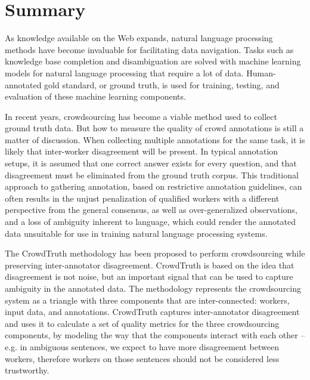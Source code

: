 \manualmark
{}

\chapter*{Summary}

As knowledge available on the Web expands, natural language processing methods have become invaluable for facilitating data navigation. Tasks such as knowledge base completion and disambiguation are solved with machine learning models for natural language processing that require a lot of data. Human-annotated gold standard, or ground truth, is used for training, testing, and evaluation of these machine learning components.

In recent years, crowdsourcing has become a viable method used to collect ground truth data. But how to measure the quality of crowd annotations is still a matter of discussion. When collecting multiple annotations for the same task, it is likely that inter-worker disagreement will be present. In typical annotation setups, it is assumed that one correct answer exists for every question, and that disagreement must be eliminated from the ground truth corpus. This traditional approach to gathering annotation, based on restrictive annotation guidelines, can often results in the unjust penalization of qualified workers with a different perspective from the general consensus, as well as over-generalized observations, and a loss of ambiguity inherent to language, which could render the annotated data unsuitable for use in training natural language processing systems.

The CrowdTruth methodology has been proposed to perform crowdsourcing while preserving inter-annotator disagreement. CrowdTruth is based on the idea that disagreement is not noise, but an important signal that can be used to capture ambiguity in the annotated data. The methodology represents the crowdsourcing system as a triangle with three components that are inter-connected: workers, input data, and annotations. CrowdTruth captures inter-annotator disagreement and uses it to calculate a set of quality metrics for the three crowdsourcing components, by modeling the way that the components interact with each other -- e.g. in ambiguous sentences, we expect to have more disagreement between workers, therefore workers on those sentences should not be considered less trustworthy.

